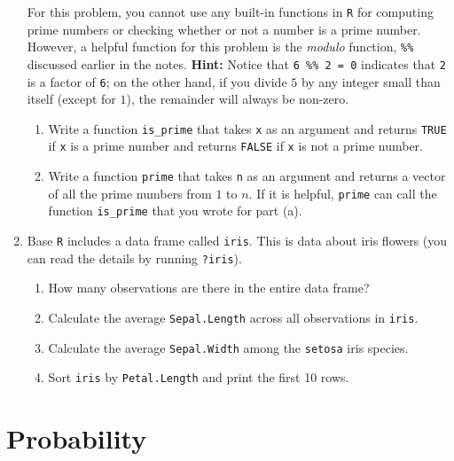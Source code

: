 \documentclass[
  letterpaper,
  DIV=11,
  numbers=noendperiod]{scrreprt}
\begin{document}
\begin{enumerate}
  For this problem, you cannot use any built-in functions in \texttt{R}
  for computing prime numbers or checking whether or not a number is a
  prime number. However, a helpful function for this problem is the
  \emph{modulo} function, \texttt{\%\%} discussed earlier in the notes.
  \textbf{Hint:} Notice that \texttt{6\ \%\%\ 2\ =\ 0} indicates that
  \texttt{2} is a factor of \texttt{6}; on the other hand, if you divide
  \(5\) by any integer small than itself (except for \(1\)), the
  remainder will always be non-zero.

  \begin{enumerate}
  \def\labelenumii{\alph{enumii})}
  \item
    Write a function \texttt{is\_prime} that takes \texttt{x} as an
    argument and returns \texttt{TRUE} if \texttt{x} is a prime number
    and returns \texttt{FALSE} if \texttt{x} is not a prime number.
  \item
    Write a function \texttt{prime} that takes \texttt{n} as an argument
    and returns a vector of all the prime numbers from \(1\) to \(n\).
    If it is helpful, \texttt{prime} can call the function
    \texttt{is\_prime} that you wrote for part (a).
  \end{enumerate}
\item
  Base \texttt{R} includes a data frame called \texttt{iris}. This is
  data about iris flowers (you can read the details by running
  \texttt{?iris}).

  \begin{enumerate}
  \def\labelenumii{\alph{enumii})}
  \item
    How many observations are there in the entire data frame?
  \item
    Calculate the average \texttt{Sepal.Length} across all observations
    in \texttt{iris}.
  \item
    Calculate the average \texttt{Sepal.Width} among the \texttt{setosa}
    iris species.
  \item
    Sort \texttt{iris} by \texttt{Petal.Length} and print the first 10
    rows.
  \end{enumerate}
\end{enumerate}


\chapter{Probability}\label{probability}
\end{document}
